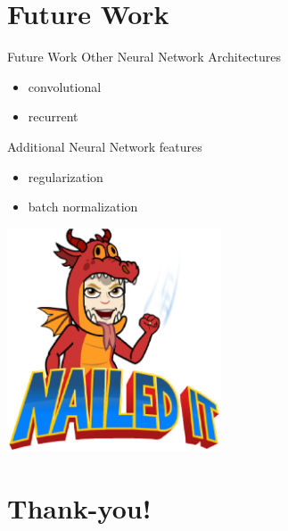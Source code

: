 \documentclass{beamer}
\begin{document}
  \section{Future Work}
  \begin{frame}{Future Work}
    Other Neural Network Architectures
    \begin{itemize}
      \item convolutional
      \item recurrent
    \end{itemize}
    Additional Neural Network features
    \begin{itemize}
      \item regularization
      \item batch normalization
    \end{itemize}
  \end{frame}

  \begin{frame}
    \begin{center}
      \includegraphics[width=2.5in]{../figures/bitmoji.eps}
    \end{center}
  \end{frame}

  \section{Thank-you!}
\end{document}
